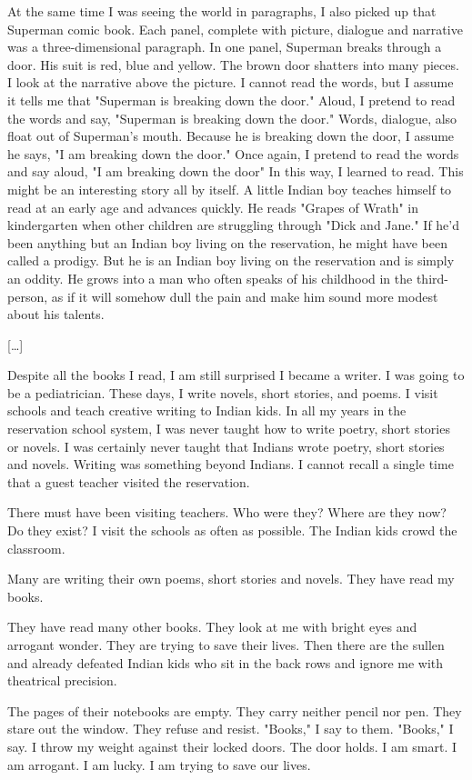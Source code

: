 \documentclass[10pt,a4paper]{article}
\begin{document}
At the same time I was seeing the world in paragraphs, I also picked up that Superman comic book. Each panel, complete with picture, dialogue and narrative was a three-dimensional paragraph. In one panel, Superman breaks through a door. His suit is red, blue and yellow. The brown door shatters into many pieces. I look at the narrative above the picture. I cannot read the words, but I assume it tells me that "Superman is breaking down the door." Aloud, I pretend to read the words and say, "Superman is breaking down the door." Words, dialogue, also float out of Superman's mouth. Because he is breaking down the door, I assume he says, "I am breaking down the door." Once again, I pretend to read the words and say aloud, "I am breaking down the door" In this way, I learned to read. This might be an interesting story all by itself. A little Indian boy teaches himself to read at an early age and advances quickly. He reads "Grapes of Wrath" in kindergarten when other children are struggling through "Dick and Jane." If he'd been anything but an Indian boy living on the reservation, he might have been called a prodigy. But he is an Indian boy living on the reservation and is simply an oddity. He grows into a man who often speaks of his childhood in the third-person, as if it will somehow dull the pain and make him sound more modest about his talents.

[\ldots]

Despite all the books I read, I am still surprised I became a writer. I was going to be a pediatrician. These days, I write novels, short stories, and poems. I visit schools and teach creative writing to Indian kids. In all my years in the reservation school system, I was never taught how to write poetry, short stories or novels. I was certainly never taught that Indians wrote poetry, short stories and novels. Writing was something beyond Indians. I cannot recall a single time that a guest teacher visited the reservation.

There must have been visiting teachers. Who were they? Where are they now? Do they exist? I visit the schools as often as possible. The Indian kids crowd the classroom.

Many are writing their own poems, short stories and novels. They have read my books.

They have read many other books. They look at me with bright eyes and arrogant wonder. They are trying to save their lives. Then there are the sullen and already defeated Indian kids who sit in the back rows and ignore me with theatrical precision.

The pages of their notebooks are empty. They carry neither pencil nor pen. They stare out the window. They refuse and resist. "Books," I say to them. "Books," I say. I throw my weight against their locked doors. The door holds. I am smart. I am arrogant. I am lucky. I am trying to save our lives. 
\end{document}
